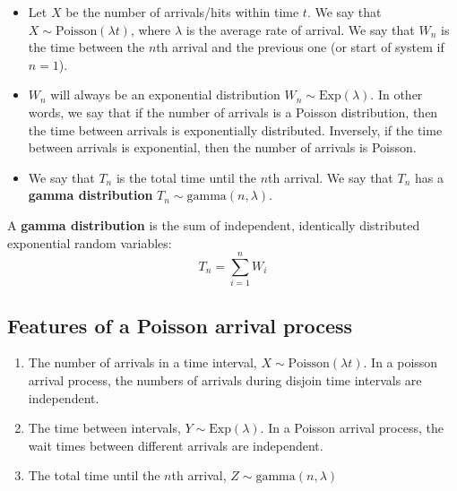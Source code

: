 \documentclass[titlepage, 12pt, leqno]{article}
\begin{document}
\begin{itemize}
    \item Let $X$ be the number of arrivals/hits within time $t$. We say that 
        $X \sim \text{Poisson}(\lambda t)$, where $\lambda$ is the average rate of
        arrival. We say that $W_n$ is the time between the $n$th arrival and the 
        previous one (or start of system if $n=1$).
    \item $W_n$ will always be an exponential distribution
        $W_n\sim\text{Exp}(\lambda)$. In other words, we say that if the number
        of arrivals is a Poisson distribution, then the time between arrivals is 
        exponentially distributed. Inversely, if the time between arrivals is 
        exponential, then the number of arrivals is Poisson.
    \item We say that $T_n$ is the total time until the $n$th arrival. We say that
        $T_n$ has a \textbf{gamma distribution} $T_n \sim \text{gamma}(n, 
        \lambda)$.
\end{itemize}

\begin{definition}
    A \textbf{gamma distribution} is the sum of independent, identically
    distributed exponential random variables:
    \[
        T_n = \sum_{i=1}^{n}W_i
    \]
\end{definition}

\subsection{Features of a Poisson arrival process}
\begin{enumerate}
    \item The number of arrivals in a time interval, $X \sim \text{Poisson}
        (\lambda t)$. In a poisson arrival process, the numbers of arrivals 
        during disjoin time intervals are independent.
    \item The time between intervals, $Y \sim \text{Exp}(\lambda)$. In a
        Poisson arrival process, the wait times between different arrivals are
        independent.
    \item The total time until the $n$th arrival, $Z \sim \text{gamma}(n,\lambda)$
\end{enumerate}
\end{document}
